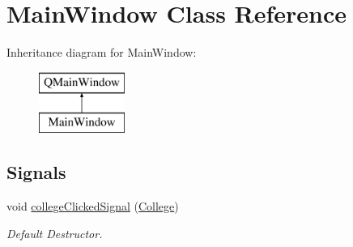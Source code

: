 \hypertarget{class_main_window}{}\section{Main\+Window Class Reference}
\label{class_main_window}
Inheritance diagram for Main\+Window\+:\begin{figure}[H]
\begin{center}
\leavevmode
\includegraphics[height=2.000000cm]{class_main_window}
\end{center}
\end{figure}
\subsection*{Signals}
\begin{DoxyCompactItemize}
\item 
\mbox{\label{class_main_window_ad176d91de00423f54f2d9eaabff52975}} 
void \mbox{\hyperlink{class_main_window_ad176d91de00423f54f2d9eaabff52975}{college\+Clicked\+Signal}} (\mbox{\hyperlink{struct_college}{College}})
\begin{DoxyCompactList}\small\item\em Default Destructor. \end{DoxyCompactList}\end{DoxyCompactItemize}
